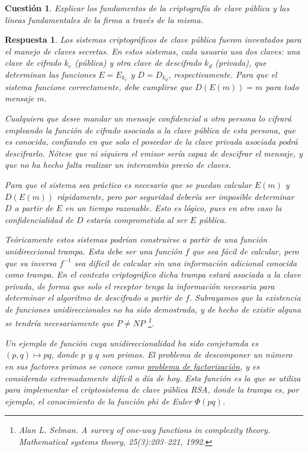 \documentclass[
  a4paper,
  spanish,
  12pt,
]{scrartcl}
\theoremstyle{ejercicio-style}
\newtheorem{ejer}{Cuestión}
\theoremstyle{remark-style}
\newtheorem*{sol}{Respuesta}
\theoremstyle{teorema-style}
\begin{document}
\begin{ejer}
  Explicar los fundamentos de la criptografía de clave pública y las líneas fundamentales de la firma a través de la misma.
\end{ejer}
\begin{sol}

  Los sistemas criptográficos de clave pública fueron inventados para el manejo de claves secretas. En estos sistemas, cada usuario usa dos claves: una clave de cifrado $k_e$ (pública) y otra clave de descifrado $k_d$ (privada), que determinan las funciones $E = E_{k_e}$ y $D = D_{k_d}$, respectivamente. Para que el sistema funcione correctamente, debe cumplirse que $D(E(m)) = m$ para todo mensaje $m$.

  Cualquiera que desee mandar un mensaje confidencial a otra persona lo cifrará empleando la función de cifrado asociada a la clave pública de esta persona, que es conocida, confiando en que solo el poseedor de la clave privada asociada podrá descifrarlo. Nótese que ni siquiera el emisor sería capaz de descifrar el mensaje, y que no ha hecho falta realizar un intercambio previo de claves.

  Para que el sistema sea práctico es necesario que se puedan calcular $E(m)$ y $D(E(m))$ rápidamente, pero por seguridad debería ser imposible determinar $D$ a partir de $E$ en un tiempo razonable. Esto es lógico, pues en otro caso la confidencialidad de $D$ estaría comprometida al ser $E$ pública.

  Teóricamente estos sistemas podrían construirse a partir de una \textit{función unidireccional trampa}. Esta debe ser una función $f$ que sea \emph{fácil} de calcular, pero que su inversa $f^{-1}$ sea \emph{difícil} de calcular sin una información adicional conocida como \textit{trampa}. En el contexto criptográfico dicha trampa estará asociada a la clave privada, de forma que solo el receptor tenga la información necesaria para determinar el algoritmo de descifrado a partir de $f$. Subrayamos que la existencia de funciones unidireccionales no ha sido demostrada, y de hecho de existir alguna se tendría necesariamente que $P \neq NP$ \footnote{Alan L. Selman. \textit{A survey of one-way functions in complexity theory}. Mathematical systems theory, 25(3):203–221, 1992.}.

  Un ejemplo de función cuya unidireccionalidad ha sido conjeturada es $(p, q) \mapsto pq$, donde $p$ y $q$ son primos. El problema de descomponer un número en sus factores primos se conoce como \href{https://en.wikipedia.org/wiki/Integer_factorization}{problema de factorización}, y es considerado extremadamente difícil a día de hoy. Esta función es la que se utiliza para implementar el criptosistema de clave pública RSA, donde la trampa es, por ejemplo, el conocimiento de la \textit{función phi de Euler} $\Phi(pq)$.


\end{sol}
\end{document}
